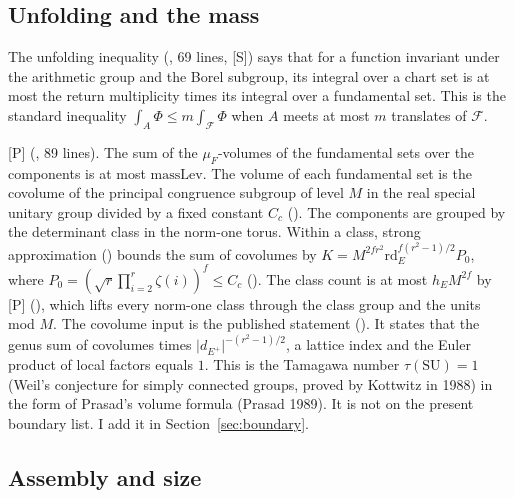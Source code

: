 \documentclass[11pt]{article}
\newcommand{\mP}{\textsf{[P]}}
\newcommand{\mS}{\textsf{[S]}}
\theoremstyle{remark}
\begin{document}
\subsection{Unfolding and the mass}

The unfolding inequality  (, 69 lines, \mS) says that for a function invariant under the arithmetic group and the Borel subgroup, its integral over a chart set is at most the return multiplicity times its integral over a fundamental set. This is the standard inequality $\int_A\Phi\le m\int_{\mathcal F}\Phi$ when $A$ meets at most $m$ translates of $\mathcal F$.

\mP{}  (, 89 lines). The sum of the $\mu_F$-volumes of the fundamental sets over the components is at most $\mathrm{massLev}$. The volume of each fundamental set is the covolume of the principal congruence subgroup of level $M$ in the real special unitary group divided by a fixed constant $C_c$ (). The components are grouped by the determinant class in the norm-one torus. Within a class, strong approximation () bounds the sum of covolumes by $K=M^{2fr^2}\mathrm{rd}_E^{f(r^2-1)/2}P_0$, where $P_0=(\sqrt r\prod_{i=2}^r\zeta(i))^f\le C_c$ (). The class count is at most $h_EM^{2f}$ by \mP{}  (), which lifts every norm-one class through the class group and the units mod $M$. The covolume input is the published statement  (). It states that the genus sum of covolumes times $\lvert d_{E^+}\rvert^{-(r^2-1)/2}$, a lattice index and the Euler product of local factors equals $1$. This is the Tamagawa number $\tau(\mathrm{SU})=1$ (Weil's conjecture for simply connected groups, proved by Kottwitz in 1988) in the form of Prasad's volume formula (Prasad 1989). It is not on the present boundary list. I add it in Section~\ref{sec:boundary}.

\subsection{Assembly and size}
\end{document}
